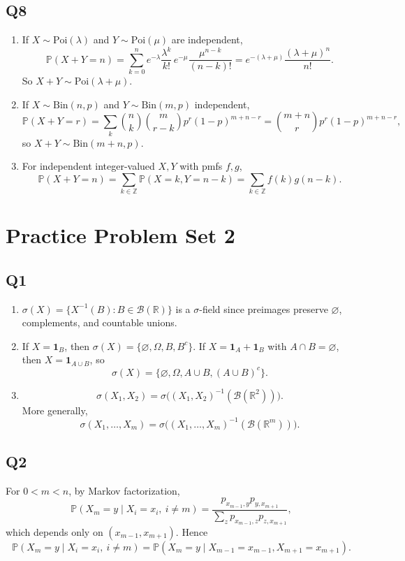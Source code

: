 \documentclass[11pt]{article}
\newcommand{\PP}{\mathbb{P}}
\newcommand{\1}{\mathbf{1}}
\newcommand{\R}{\mathbb{R}}
\begin{document}
\subsection*{Q8}
\begin{enumerate}[label=(\alph*)]
\item If $X\sim \mathrm{Poi}(\lambda)$ and $Y\sim \mathrm{Poi}(\mu)$ are independent,
\[
\PP(X+Y=n)=\sum_{k=0}^n e^{-\lambda}\frac{\lambda^k}{k!}\,e^{-\mu}\frac{\mu^{n-k}}{(n-k)!}
=e^{-(\lambda+\mu)}\frac{(\lambda+\mu)^n}{n!}.
\]
So $X+Y\sim\mathrm{Poi}(\lambda+\mu)$.
\item If $X\sim\mathrm{Bin}(n,p)$ and $Y\sim\mathrm{Bin}(m,p)$ independent,
\[
\PP(X+Y=r)=\sum_k\binom{n}{k}\binom{m}{r-k}p^r(1-p)^{m+n-r}
=\binom{m+n}{r}p^r(1-p)^{m+n-r},
\]
so $X+Y\sim\mathrm{Bin}(m+n,p)$.
\item For independent integer-valued $X,Y$ with pmfs $f,g$,
\[
\PP(X+Y=n)=\sum_{k\in\mathbb Z}\PP(X=k,Y=n-k)=\sum_{k\in\mathbb Z}f(k)g(n-k).
\]
\end{enumerate}

\section{Practice Problem Set 2}

\subsection*{Q1}
\begin{enumerate}[label=(\alph*)]
\item $\sigma(X)=\{X^{-1}(B):B\in\mathcal B(\R)\}$ is a $\sigma$-field since preimages preserve $\varnothing$, complements, and countable unions.
\item If $X=\1_B$, then $\sigma(X)=\{\varnothing,\Omega,B,B^c\}$. If $X=\1_A+\1_B$ with $A\cap B=\varnothing$, then $X=\1_{A\cup B}$, so
\[
\sigma(X)=\{\varnothing,\Omega,A\cup B,(A\cup B)^c\}.
\]
\item
\[
\sigma(X_1,X_2)=\sigma\big((X_1,X_2)^{-1}(\mathcal B(\R^2))\big).
\]
More generally,
\[
\sigma(X_1,\dots,X_m)=\sigma\big((X_1,\dots,X_m)^{-1}(\mathcal B(\R^m))\big).
\]
\end{enumerate}

\subsection*{Q2}
For $0<m<n$, by Markov factorization,
\[
\PP(X_m=y\mid X_i=x_i,\ i\neq m)=\frac{p_{x_{m-1},y}p_{y,x_{m+1}}}{\sum_{z}p_{x_{m-1},z}p_{z,x_{m+1}}},
\]
which depends only on $(x_{m-1},x_{m+1})$. Hence
\[
\PP(X_m=y\mid X_i=x_i,\ i\neq m)=\PP(X_m=y\mid X_{m-1}=x_{m-1},X_{m+1}=x_{m+1}).
\]
\end{document}
